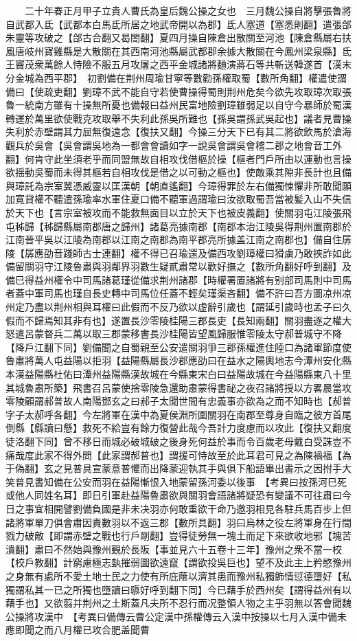 　　二十年春正月甲子立貴人曹氏為皇后魏公操之女也　三月魏公操自將擊張魯將自武都入氐【武都本白馬氐所居之地武帝開以為郡】氐人塞道【塞悉則翻】遣張郃朱靈等攻破之【郃古合翻又曷閤翻】夏四月操自陳倉出散關至河池【陳倉縣屬右扶風唐岐州寶雞縣是大散關在其西南河池縣屬武都郡余據大散關在今鳳州梁泉縣】氐王竇茂衆萬餘人恃險不服五月攻屠之西平金城諸將麯演蔣石等共斬送韓遂首【漢末分金城為西平郡】　初劉備在荆州周瑜甘寧等數勸孫權取蜀【數所角翻】權遣使謂備曰【使疏吏翻】劉璋不武不能自守若使曹操得蜀則荆州危矣今欲先攻取璋次取張魯一統南方雖有十操無所憂也備報曰益州民富地險劉璋雖弱足以自守今暴師於蜀漢轉運於萬里欲使戰克攻取舉不失利此孫吳所難也【孫吳謂孫武吳起也】議者見曹操失利於赤壁謂其力屈無復遠念【復扶又翻】今操三分天下已有其二將欲飲馬於滄海觀兵於吳會【吳會謂吳地為一都會會讀如字一說吳會謂吳會稽二郡之地會音工外翻】何肯守此坐須老乎而同盟無故自相攻伐借樞於操【樞者門戶所由以運動也言操欲揺動吳蜀而未得其樞若自相攻伐是借之以可動之樞也】使敵乘其隙非長計也且備與璋託為宗室冀憑威靈以匡漢朝【朝直遙翻】今璋得罪於左右備獨悚懼非所敢聞願加寛貸權不聽遣孫瑜率水軍住夏口備不聽軍過謂瑜曰汝欲取蜀吾當被髪入山不失信於天下也【言宗室被攻而不能救無面目以立於天下也被皮義翻】使關羽屯江陵張飛屯秭歸【秭歸縣屬南郡唐之歸州】諸葛亮據南郡【南郡本治江陵吳得荆州置南郡於江南晉平吳以江陵為南郡以江南之南郡為南平郡亮所據盖江南之南郡也】備自住孱陵【孱應劭音踐師古士連翻】權不得已召瑜還及備西攻劉璋權曰猾虜乃敢挾詐如此備留關羽守江陵魯肅與羽鄰界羽數生疑貳肅常以歡好撫之【數所角翻好呼到翻】及備巳得益州權令中司馬諸葛瑾從備求荆州諸郡【時權署置諸將有别部司馬則中司馬者蓋中軍司馬也瑾自長史轉中司馬位任蓋不輕矣瑾渠吝翻】備不許曰吾方圖凉州凉州定乃盡以荆州相與耳權曰此假而不反乃欲以虚辭引歲也【謂延引歲時也孟子曰久假而不歸焉知其非有也】遂置長沙零陵桂陽三郡長吏【長知兩翻】關羽盡逐之權大怒遣呂蒙督兵二萬以取三郡蒙移書長沙桂陽皆望風歸服惟零陵太守郝普城守不降【降戶江翻下同】劉備聞之自蜀親至公安遣關羽爭三郡孫權進住陸口為諸軍節度使魯肅將萬人屯益陽以拒羽【益陽縣屬長沙郡應劭曰在益水之陽輿地志今潭州安化縣本漢益陽縣杜佑曰潭州益陽縣漢故城在今縣東宋白曰益陽故城在今益陽縣東八十里其城魯肅所築】飛書召呂蒙使捨零陵急還助肅蒙得書祕之夜召諸將授以方畧晨當攻零陵顧謂郝普故人南陽鄧玄之曰郝子太聞世間有忠義事亦欲為之而不知時也【郝普字子太郝呼各翻】今左將軍在漢中為夏侯淵所圍關羽在南郡至尊身自臨之彼方首尾倒縣【縣讀曰懸】救死不給豈有餘力復營此哉今吾計力度慮而以攻此【復扶又翻度徒洛翻下同】曾不移日而城必破城破之後身死何益於事而令百歲老母戴白受誅豈不痛哉度此家不得外問【此家謂郝普也】謂援可恃故至於此耳君可見之為陳禍福【為于偽翻】玄之見普具宣蒙意普懼而出降蒙迎執其手與俱下船語畢出書示之因拊手大笑普見書知備在公安而羽在益陽慚恨入地蒙留孫河委以後事　【考異曰按孫河巳死或他人同姓名耳】即日引軍赴益陽魯肅欲與關羽會語諸將疑恐有變議不可往肅曰今日之事宜相開譬劉備負國是非未决羽亦何敢重欲干命乃邀羽相見各駐兵馬百步上但諸將軍單刀俱會肅因責數羽以不返三郡【數所具翻】羽曰烏林之役左將軍身在行間戮力破敵【即謂赤壁之戰也行戶剛翻】豈得徒勞無一塊土而足下來欲收地邪【塊苦潰翻】肅曰不然始與豫州覲於長阪【事並見六十五卷十三年】豫州之衆不當一校【校戶教翻】計窮慮極志埶摧弱圖欲遠竄【謂欲投吳巨也】望不及此主上矜愍豫州之身無有處所不愛土地士民之力使有所庇䕃以濟其患而豫州私獨飾情愆德墮好【私獨謂私其一已之所獨也墮讀曰隳好呼到翻下同】今已藉手於西州矣【謂得益州有以藉手也】又欲翦并荆州之土斯蓋凡夫所不忍行而况整領人物之主乎羽無以答會聞魏公操將攻漢中　【考異曰備傳云曹公定漢中孫權傳云入漢中按操以七月入漢中備未應即聞之而八月權已攻合肥盖聞曹